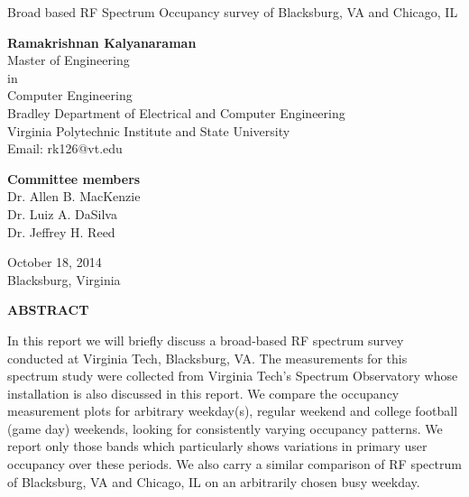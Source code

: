 \documentclass[12pt,sts]{report}
\begin{document}

\thispagestyle{empty}
\begin{center}

{\Large 
Broad based RF Spectrum Occupancy survey of Blacksburg, VA and Chicago, IL
}

\vfill

\textbf{Ramakrishnan Kalyanaraman} \\
Master of Engineering \\
in \\
Computer Engineering \\
Bradley Department of Electrical and Computer Engineering \\
Virginia Polytechnic Institute and State University \\
Email: rk126@vt.edu

\vfill

\textbf{Committee members} \\
Dr. Allen B. MacKenzie \\
Dr. Luiz A. DaSilva \\
Dr. Jeffrey H. Reed

\vfill

October 18, 2014 \\
Blacksburg, Virginia

\end{center}

\pagebreak

\thispagestyle{empty}

\begin{center}

\textbf{ABSTRACT}

\end{center}

In this report we will briefly discuss a broad-based RF spectrum survey conducted at Virginia Tech, Blacksburg, VA. The measurements for this spectrum study were collected from Virginia Tech's Spectrum Observatory whose installation is also discussed in this report. We compare the occupancy measurement plots for arbitrary weekday(s), regular weekend and college football (game day) weekends, looking for consistently varying occupancy patterns. We report only those bands which particularly shows variations in primary user occupancy over these periods. We also carry a similar comparison of RF spectrum of Blacksburg, VA and Chicago, IL on an arbitrarily chosen busy weekday.

\vfill

\pagebreak
\end{document}
